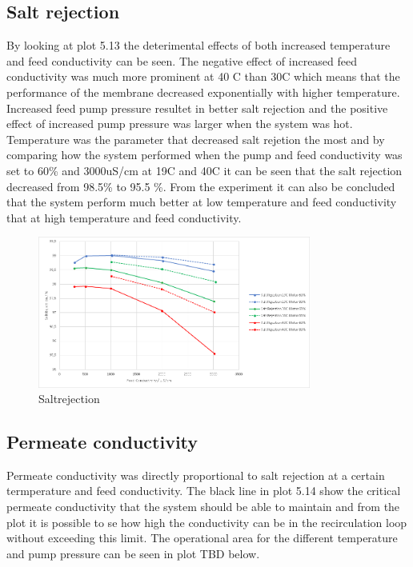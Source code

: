 \subsection{Salt rejection}

By looking at plot 5.13 the deterimental effects of both increased temperature and feed conductivity can be seen. The negative effect of increased feed conductivity was much more prominent at 40 C than 30C which means that the performance of the membrane decreased exponentially with higher temperature. Increased feed pump pressure resultet in better salt rejection and the positive effect of increased pump pressure was larger when the system was hot. Temperature was the parameter that decreased salt rejetion the most and by comparing how the system performed when the pump and feed conductivity was set to 60\% and 3000uS/cm at 19C and 40C it can be seen that the salt rejection decreased from 98.5\% to 95.5 \%. From the experiment it can also be concluded that the system perform much better at low temperature and feed conductivity that at high temperature and feed conductivity. 

\begin{figure}[H]
    \centering
    \includegraphics[width=0.8\textwidth]{SaltRejection}
    \caption{Saltrejection}
    \label{fig:SalrRejectionResult}
\end{figure}
 
\subsection{Permeate conductivity}

Permeate conductivity was directly proportional to salt rejection at a certain termperature and feed conductivity. The black line in plot 5.14 show the critical permeate conductivity that the system should be able to maintain and from the plot it is possible to se how high the conductivity can be in the recirculation loop without exceeding this limit. The operational area for the different temperature and pump pressure can be seen in plot TBD below.

